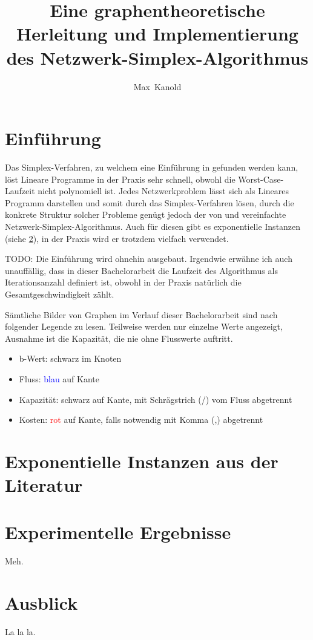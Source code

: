 \documentclass[11pt,a4paper,twoside,ngerman,openany]{scrbook}
\author{Max~Kanold}
\title{Eine graphentheoretische Herleitung und Implementierung des Netzwerk-Simplex-Algorithmus}
\theoremstyle{plain}
\theoremstyle{definition}
\begin{document}
\frontmatter
\maketitle
\cleardoublepage
\tableofcontents
\cleardoublepage

\mainmatter
\chapter{Einführung}
Das Simplex-Verfahren, zu welchem eine Einführung in \cite{NSAbook} gefunden werden kann, löst Lineare Programme in der Praxis sehr schnell, obwohl die Worst-Case-Laufzeit nicht polynomiell ist. Jedes Netzwerkproblem lässt sich als Lineares Programm darstellen und somit durch das Simplex-Verfahren lösen, durch die konkrete Struktur solcher Probleme genügt jedoch der von \cite[Dantzig, 1951]{erf1} und \cite[Orden, 1956]{erf2} vereinfachte Netzwerk-Simplex-Algorithmus. Auch für diesen gibt es exponentielle Instanzen (siehe \cref{ch:lit}), in der Praxis wird er trotzdem vielfach verwendet.

TODO: Die Einführung wird ohnehin ausgebaut. Irgendwie erwähne ich auch unauffällig, dass in dieser Bachelorarbeit die Laufzeit des Algorithmus als Iterationsanzahl definiert ist, obwohl in der Praxis natürlich die Gesamtgeschwindigkeit zählt.

Sämtliche Bilder von Graphen im Verlauf dieser Bachelorarbeit sind nach folgender Legende zu lesen. Teilweise werden nur einzelne Werte angezeigt, Ausnahme ist die Kapazität, die nie ohne Flusswerte auftritt.
\begin{itemize}\itemsep0em
    \item b-Wert: schwarz im Knoten
    \item Fluss: \textcolor{blue}{blau} auf Kante
    \item Kapazität: schwarz auf Kante, mit Schrägstrich (/) vom Fluss abgetrennt
    \item Kosten: \textcolor{red}{rot} auf Kante, falls notwendig mit Komma (,) abgetrennt
\end{itemize}



\chapter{Exponentielle Instanzen aus der Literatur}\label{ch:lit}

\chapter{Experimentelle Ergebnisse}\label{ch:erg}
Meh.

\chapter{Ausblick}
La la la.

\backmatter
{}

\end{document}
